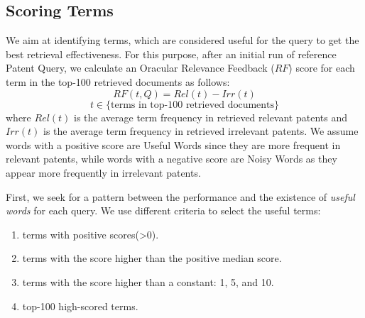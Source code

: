 \subsection{Scoring Terms}
\label{OracularTermSelection}
We aim at identifying terms, which are considered useful for the query to get the best retrieval effectiveness. For this purpose, 
after an initial run of reference Patent Query, we
calculate an Oracular Relevance Feedback ($\mathit{RF}$) score for each term in the top-100
retrieved documents as follows:
\begin{equation}
RF(t,Q)=Rel(t)-Irr(t) 
 \label{eq:score}
\end{equation}
\begin{displaymath}t\in \lbrace \mbox{terms in top-100 retrieved documents}\rbrace\end{displaymath}
where $ \mathit{Rel(t)} $ is the average term frequency in retrieved relevant patents and $ \mathit{Irr(t)} $ is the average term frequency in retrieved irrelevant patents. We assume words with a positive score are Useful Words since they are more frequent in relevant patents, while words with a negative score are Noisy Words as they appear more frequently in irrelevant patents. 

First, we seek for a pattern between the performance and the existence of \textit{useful words} for each query. We use different criteria to select the useful terms:
\begin{enumerate}
\item terms with positive scores(>0).
\item terms with the score higher than the positive median score.
\item terms with the score higher than a constant: 1, 5, and 10.
\item top-100 high-scored terms.
\end{enumerate}

